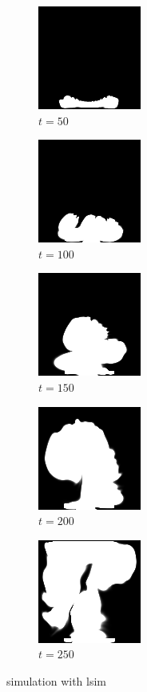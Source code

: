 \documentclass[a4paper,12pt,twoside]{report}
\begin{document}
\begin{figure}
\centering
\begin{subfigure}{0.18\textwidth}
  \centering
  \includegraphics[scale=0.56]{buoyancy/dens_000050_lsim.png}
  \caption{$t=50$}
\end{subfigure}
\begin{subfigure}{0.18\textwidth}
  \centering
  \includegraphics[scale=0.56]{buoyancy/dens_000100_lsim.png}
  \caption{$t=100$}
\end{subfigure}
\begin{subfigure}{0.18\textwidth}
  \centering
  \includegraphics[scale=0.56]{buoyancy/dens_000150_lsim.png}
  \caption{$t=150$}
\end{subfigure}
\begin{subfigure}{0.18\textwidth}
  \centering
  \includegraphics[scale=0.56]{buoyancy/dens_000200_lsim.png}
  \caption{$t=200$}
\end{subfigure}
\begin{subfigure}{0.18\textwidth}
  \centering
  \includegraphics[scale=0.56]{buoyancy/dens_000249_lsim.png}
  \caption{$t=250$}
\end{subfigure}
\caption{simulation with lsim}
\end{figure}
\end{document}
